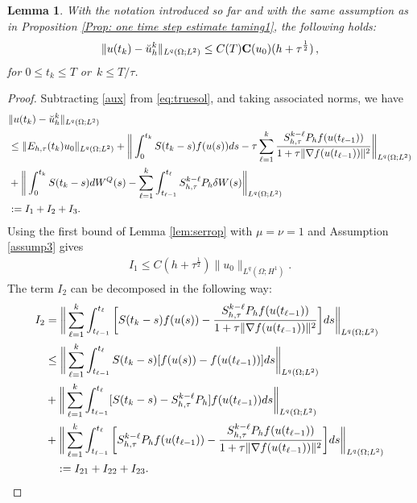 \documentclass[reqno, 11pt]{amsart}
\theoremstyle{plain}
\newtheorem{lemma}[theorem]{Lemma}
\theoremstyle{definition}
\theoremstyle{remark}
\numberwithin{equation}{section}
\numberwithin{theorem}{section}
\newcommand{\con}{\mathbf{C}}
\begin{document}
{\begin{lemma}\label{lem:erruhat}
With the notation introduced so far and with the same assumption as in Proposition \ref{Prop: one time  step estimate taming1}, the following holds: 
\begin{align}
\|u(t_k)-\breve{u}_h^k\|_{L^q(\Omega;L^2)}
\leq C(T)\con(u_0)(h+\tau^{\frac{1}{2}}) \, ,\notag
\end{align}
for $0\leq t_k \leq T$
or\  $k\leq T/\tau$. 
\end{lemma}

\begin{proof} Subtracting \eqref{aux} from \eqref{eq:truesol}, and taking associated norms, we have
\begin{align}
&\|u(t_k)-\breve{u}_h^k\|_{L^q(\Omega; L^2)}\notag\\
&\leq \|E_{h,\tau}(t_k)u_0\|_{L^q(\Omega;L^2)}+\bigg\|\int_0^{t_k}S(t_k-s)f(u(s))ds-\tau\sum\limits_{\ell=1}^{k} \frac{S_{h,\tau}^{k-\ell}P_hf(u(t_{\ell-1}))}{1+\tau\|\nabla f(u(t_{\ell-1}))\|^2}\bigg\|_{L^q(\Omega;L^2)}\notag\\
&+\bigg\|\int_0^{t_k}S(t_k-s)dW^Q(s)-\sum\limits_{\ell=1}^k \int_{t_{\ell-1}}^{t_\ell}S_{h,\tau}^{k-\ell}P_h\delta W(s)\bigg\|_{L^q(\Omega;L^2)}\notag\\
&:=I_1+I_2+I_3.
\end{align}
Using the first bound  of Lemma \ref{lem:serrop}  with $\mu=\nu=1$ and Assumption \ref{assump3} gives 
\begin{align}
I_1\leq C(h+\tau^{\frac{1}{2}})\|u_0\|_{L^q(\Omega;H^1)}.
\end{align}
The term $I_2$ can be decomposed in the following way:
\begin{align}
I_2 & =\bigg\|\sum\limits_{\ell=1}^k\int_{t_{\ell-1}}^{t_\ell}\bigg[S(t_k-s)f(u(s))-\frac{S_{h,\tau}^{k-\ell}P_hf(u(t_{\ell-1}))}{1+\tau\|\nabla f(u(t_{\ell-1}))\|^2}\bigg]ds\bigg\|_{L^q(\Omega;L^2)}\notag\\
&\leq \bigg\|\sum\limits_{\ell=1}^k\int_{t_{\ell-1}}^{t_\ell}S(t_k-s)[f(u(s))-f(u(t_{\ell-1}))]ds\bigg\|_{L^q(\Omega;L^2)}\notag\\
&+\bigg\|\sum\limits_{\ell=1}^k\int_{t_{\ell-1}}^{t_\ell}[S(t_k-s)-S_{h,\tau}^{k-\ell}P_h]f(u(t_{\ell-1}))ds\bigg\|_{L^q(\Omega;L^2)}\notag\\
&+\bigg\|\sum\limits_{\ell=1}^k\int_{t_{\ell-1}}^{t_\ell}\bigg[S_{h,\tau}^{k-\ell}P_hf(u(t_{\ell-1}))-\frac{S_{h,\tau}^{k-\ell}P_hf(u(t_{\ell-1}))}{1+\tau\|\nabla f(u(t_{\ell-1}))\|^2}\bigg]ds\bigg\|_{L^q(\Omega;L^2)}\notag\\
&\quad:=I_{21}+I_{22}+I_{23}.
\end{align}


\end{proof}}
\end{document}
